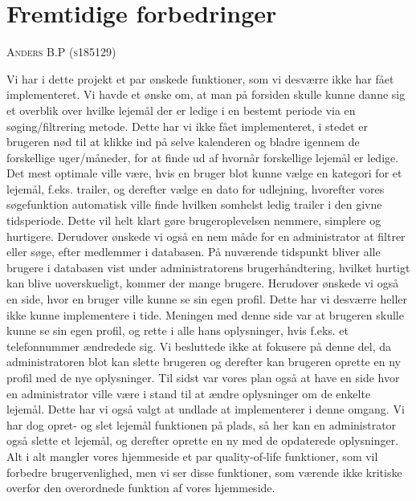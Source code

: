 \documentclass[12pt,a4paper]{report} %
\makeatletter
\newcommand\chapterauthor[1]{\authortoc{#1}\printchapterauthor{#1}}
\newcommand{\printchapterauthor}[1]{%
  {\parindent0pt\vspace*{-25pt}%
  \linespread{1.1}\large\scshape#1%
  \par\nobreak\vspace*{35pt}}
  \@afterheading%
}
\newcommand{\authortoc}[1]{%
  \addtocontents{toc}{\vskip-10pt}%
  \addtocontents{toc}{%
    \protect\contentsline{chapter}%
    {\hskip1.3em\mdseries\scshape\protect\scriptsize#1}{}{}}
  \addtocontents{toc}{\vskip5pt}%
}
\makeatother
\begin{document}
    \chapter{Fremtidige forbedringer}
    \chapterauthor{Anders B.P (s185129)}
    Vi har i dette projekt et par ønskede funktioner, som vi desværre ikke har fået implementeret. Vi havde et ønske om, at man på forsiden skulle kunne danne sig et overblik over hvilke lejemål der er ledige i en bestemt periode via en søging/filtrering metode. Dette har vi ikke fået implementeret, i stedet er brugeren nød til at klikke ind på selve kalenderen og bladre igennem de forskellige uger/måneder, for at finde ud af hvornår forskellige lejemål er ledige. Det mest optimale ville være, hvis en bruger blot kunne vælge en kategori for et lejemål, f.eks. trailer, og derefter vælge en dato for udlejning, hvorefter vores søgefunktion automatisk ville finde hvilken somhelst ledig trailer i den givne tidsperiode.
    Dette vil helt klart gøre brugeroplevelsen nemmere, simplere og hurtigere. 
    \newline Derudover ønskede vi også en nem måde for en administrator at filtrer eller søge, efter medlemmer i databasen. På nuværende tidspunkt bliver alle brugere i databasen vist under administratorens brugerhåndtering, hvilket hurtigt kan blive uoverskueligt, kommer der mange brugere. 
    \newline Herudover ønskede vi også en side, hvor en bruger ville kunne se sin egen profil. Dette har vi desværre heller ikke kunne implementere i tide. Meningen med denne side var at brugeren skulle kunne se sin egen profil, og rette i alle hans oplysninger, hvis f.eks. et telefonnummer ændredede sig. Vi besluttede ikke at fokusere på denne del, da administratoren blot kan slette brugeren og derefter kan brugeren oprette en ny profil med de nye oplysninger. 
    \newline Til sidst var vores plan også at have en side hvor en administrator ville være i stand til at ændre oplysninger om de enkelte lejemål. Dette har vi også valgt at undlade at implementerer i denne omgang. Vi har dog opret- og slet lejemål funktionen på plads, så her kan en administrator også slette et lejemål, og derefter oprette en ny med de opdaterede oplysninger. 
    \newline Alt i alt mangler vores hjemmeside et par quality-of-life funktioner, som vil forbedre brugervenlighed, men vi ser disse funktioner, som værende ikke kritiske overfor den overordnede funktion af vores hjemmeside. 
    
\end{document}

